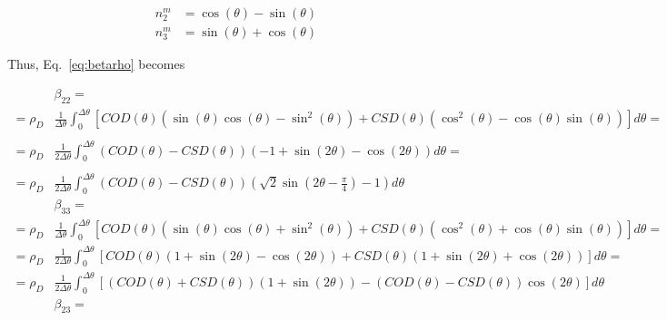 \documentclass[review]{elsarticle}
\begin{document}
\begin{equation}
\begin{aligned}
n_{2}^{m}&=\cos{\left(\theta\right)}-\sin{\left(\theta\right)}\\
n_{3}^{m}&=\sin{\left(\theta\right)}+\cos{\left(\theta\right)}
\end{aligned}
\end{equation}

Thus, Eq.~\ref{eq:betarho} becomes

\begin{equation}
\begin{aligned}
&\beta_{22}=\\=\rho_{D}&\frac{1}{\Delta\theta}\int_{0}^{\Delta\theta}\left[COD\left(\theta\right)\left(\sin{\left(\theta\right)}\cos{\left(\theta\right)}-\sin^{2}{\left(\theta\right)}\right)+CSD\left(\theta\right)\left(\cos^{2}{\left(\theta\right)}-\cos{\left(\theta\right)}\sin{\left(\theta\right)}\right)\right]d\theta=\\
\\=\rho_{D}&\frac{1}{2\Delta\theta}\int_{0}^{\Delta\theta}\left(COD\left(\theta\right)-CSD\left(\theta\right)\right)\left(-1+\sin\left(2\theta\right)-\cos\left(2\theta\right)\right)d\theta=\\
\\=\rho_{D}&\frac{1}{2\Delta\theta}\int_{0}^{\Delta\theta}\left(COD\left(\theta\right)-CSD\left(\theta\right)\right)\left(\sqrt{2}\sin\left(2\theta-\frac{\pi}{4}\right)-1\right)d\theta\\
&\beta_{33}=\\
=\rho_{D}&\frac{1}{\Delta\theta}\int_{0}^{\Delta\theta}\left[COD\left(\theta\right)\left(\sin{\left(\theta\right)}\cos{\left(\theta\right)}+\sin^{2}{\left(\theta\right)}\right)+CSD\left(\theta\right)\left(\cos^{2}{\left(\theta\right)}+\cos{\left(\theta\right)}\sin{\left(\theta\right)}\right)\right]d\theta=\\
=\rho_{D}&\frac{1}{2\Delta\theta}\int_{0}^{\Delta\theta}\left[COD\left(\theta\right)\left(1+\sin\left(2\theta\right)-\cos\left(2\theta\right)\right)+CSD\left(\theta\right)\left(1+\sin\left(2\theta\right)+\cos\left(2\theta\right)\right)\right]d\theta=\\
=\rho_{D}&\frac{1}{2\Delta\theta}\int_{0}^{\Delta\theta}\left[\left(COD\left(\theta\right)+CSD\left(\theta\right)\right)\left(1+\sin\left(2\theta\right)\right)-\left(COD\left(\theta\right)-CSD\left(\theta\right)\right)\cos\left(2\theta\right)\right]d\theta\\
&\beta_{23}=\\

\end{aligned}
\end{equation}
\end{document}

